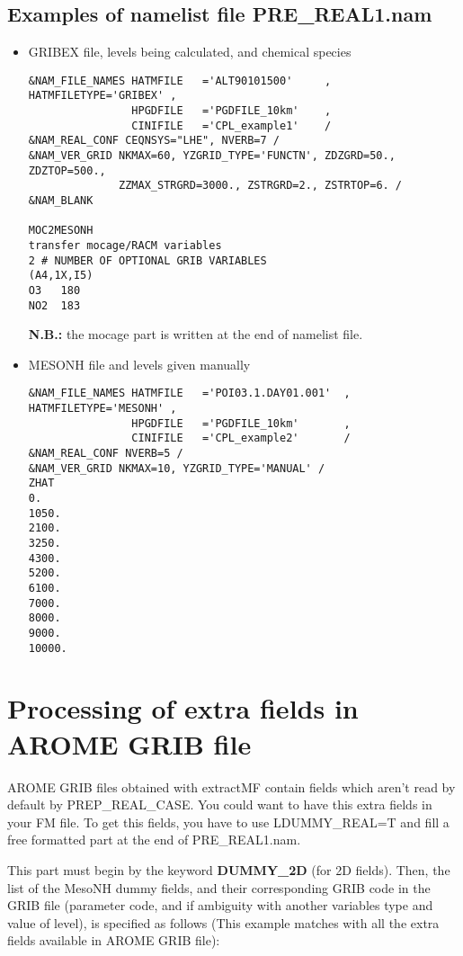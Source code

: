 \subsection{Examples of namelist file PRE\_REAL1.nam}
\begin{itemize}
\item GRIBEX file, levels being calculated, and chemical species
\begin{verbatim}
&NAM_FILE_NAMES HATMFILE   ='ALT90101500'     , HATMFILETYPE='GRIBEX' ,
                HPGDFILE   ='PGDFILE_10km'    ,
                CINIFILE   ='CPL_example1'    /
&NAM_REAL_CONF CEQNSYS="LHE", NVERB=7 /
&NAM_VER_GRID NKMAX=60, YZGRID_TYPE='FUNCTN', ZDZGRD=50., ZDZTOP=500., 
              ZZMAX_STRGRD=3000., ZSTRGRD=2., ZSTRTOP=6. /
&NAM_BLANK
              
MOC2MESONH
transfer mocage/RACM variables 
2 # NUMBER OF OPTIONAL GRIB VARIABLES
(A4,1X,I5)
O3   180
NO2  183
\end{verbatim}
{\bf N.B.:} the mocage part is written at the end of namelist file.
\subitem

\item MESONH file and levels given manually
\begin{verbatim}
&NAM_FILE_NAMES HATMFILE   ='POI03.1.DAY01.001'  , HATMFILETYPE='MESONH' ,
                HPGDFILE   ='PGDFILE_10km'       ,
                CINIFILE   ='CPL_example2'       /
&NAM_REAL_CONF NVERB=5 /
&NAM_VER_GRID NKMAX=10, YZGRID_TYPE='MANUAL' /
ZHAT
0.
1050.
2100.
3250.
4300.
5200.
6100.
7000.
8000.
9000.
10000.
\end{verbatim}
\end{itemize}


\section{Processing of extra fields in AROME GRIB file}
\label{i:realdummy}

AROME GRIB files obtained with extractMF contain fields which aren't read by default by PREP\_REAL\_CASE. You could want to have this extra fields in your FM file. To get this fields, you have to use LDUMMY\_REAL=T and fill a free formatted part at the end of PRE\_REAL1.nam.

This part must begin by the keyword {\bf DUMMY\_2D} (for 2D fields).
Then, the list of the MesoNH dummy fields, and their corresponding GRIB code in the GRIB file (parameter code, and if 
ambiguity with another variables type and value of level),
 is specified as follows (This example  matches with all the extra fields available in AROME GRIB file): 

